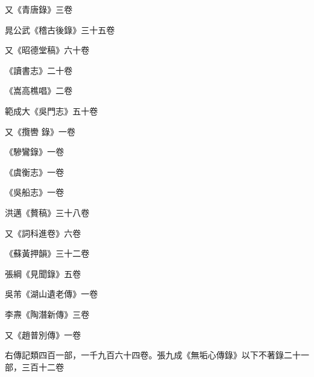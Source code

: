 \begin{pinyinscope}
 又《青唐錄》三卷



 晁公武《稽古後錄》三十五卷



 又《昭德堂稿》六十卷



 《讀書志》二十卷



 《嵩高樵唱》二卷



 範成大《吳門志》五十卷



 又《攬轡
 錄》一卷



 《驂鸞錄》一卷



 《虞衡志》一卷



 《吳船志》一卷



 洪邁《贅稿》三十八卷



 又《詞科進卷》六卷



 《蘇黃押韻》三十二卷



 張綱《見聞錄》五卷



 吳芾《湖山遺老傳》一卷



 李燾《陶潛新傳》三卷



 又《趙普別傳》一卷



 右傳記類四百一部，一千九百六十四卷。張九成《無垢心傳錄》以下不著錄二十一部，三百十二卷



\end{pinyinscope}